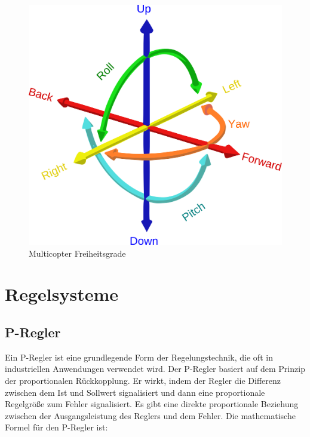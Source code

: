\begin{figure}[H]
\begin{centering}
    \includegraphics[scale=0.2]{images/multicopter_freiheitsgrade.png}
    
    \caption{\label{fig:freiheitsgrade}Multicopter Freiheitsgrade \cite{imgfreiheitsgrade}}
\end{centering}
   
\end{figure}
    




\section{Regelsysteme} \label{regelsysteme:section}


    \subsection{P-Regler}
    \label{chp:p-regler}
    
    Ein \ac{P-Regler} ist eine grundlegende Form der Regelungstechnik, die oft in industriellen Anwendungen verwendet wird. Der \ac{P-Regler} basiert auf dem Prinzip der proportionalen Rückkopplung. Er wirkt, indem der Regler die Differenz zwischen dem Ist und Sollwert signalisiert und dann eine proportionale Regelgröße zum Fehler signalisiert.
    Es gibt eine direkte proportionale Beziehung zwischen der Ausgangsleistung des Reglers und dem Fehler. Die mathematische Formel für den P-Regler ist: 

